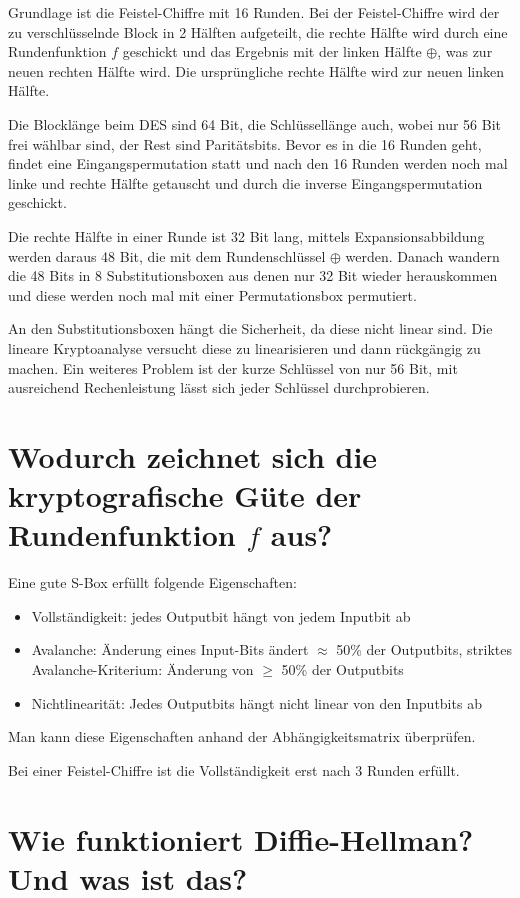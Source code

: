 \documentclass{article}
\begin{document}
	Grundlage ist die Feistel-Chiffre mit 16 Runden. Bei der Feistel-Chiffre wird der zu verschlüsselnde Block in 2 Hälften aufgeteilt, die rechte Hälfte wird durch eine Rundenfunktion $f$ geschickt und das Ergebnis mit der linken Hälfte $\oplus$, was zur neuen rechten Hälfte wird. Die ursprüngliche rechte Hälfte wird zur neuen linken Hälfte.
	
	Die Blocklänge beim DES sind 64 Bit, die Schlüssellänge auch, wobei nur 56 Bit frei wählbar sind, der Rest sind Paritätsbits. Bevor es in die 16 Runden geht, findet eine Eingangspermutation statt und nach den 16 Runden werden noch mal linke und rechte Hälfte getauscht und durch die inverse Eingangspermutation geschickt.
	
	Die rechte Hälfte in einer Runde ist 32 Bit lang, mittels Expansionsabbildung werden daraus 48 Bit, die mit dem Rundenschlüssel $\oplus$ werden. Danach wandern die 48 Bits in 8 Substitutionsboxen aus denen nur 32 Bit wieder herauskommen und diese werden noch mal mit einer Permutationsbox permutiert.
	
	An den Substitutionsboxen hängt die Sicherheit, da diese nicht linear sind. Die lineare Kryptoanalyse versucht diese zu linearisieren und dann rückgängig zu machen. Ein weiteres Problem ist der kurze Schlüssel von nur 56 Bit, mit ausreichend Rechenleistung lässt sich jeder Schlüssel durchprobieren.
	
	\section*{Wodurch zeichnet sich die kryptografische Güte der Rundenfunktion $f$ aus?}
	
	Eine gute S-Box erfüllt folgende Eigenschaften:
	\begin{itemize}
		\item Vollständigkeit: jedes Outputbit hängt von jedem Inputbit ab
		\item Avalanche: Änderung eines Input-Bits ändert $\approx$ 50\% der Outputbits, striktes Avalanche-Kriterium: Änderung von $\ge$ 50\% der Outputbits
		\item Nichtlinearität: Jedes Outputbits hängt nicht linear von den Inputbits ab
	\end{itemize}
	Man kann diese Eigenschaften anhand der Abhängigkeitsmatrix überprüfen.

	Bei einer Feistel-Chiffre ist die Vollständigkeit erst nach 3 Runden erfüllt.
	
	\section*{Wie funktioniert Diffie-Hellman? Und was ist das?}
	
\end{document}
